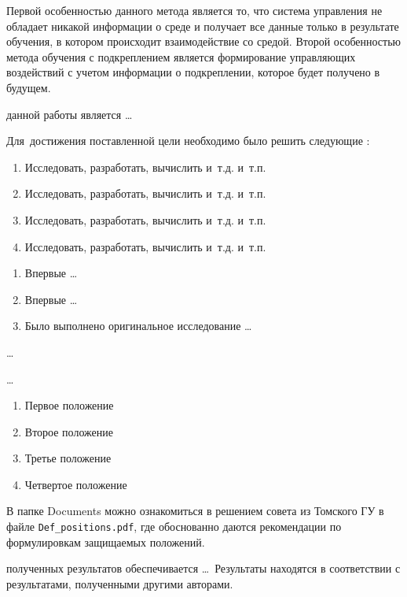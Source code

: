 Первой особенностью данного метода является то, что система управления не обладает никакой информации о среде и получает все данные только в результате обучения, в котором происходит взаимодействие со средой. Второй особенностью метода обучения с подкреплением является формирование управляющих воздействий с учетом информации о подкреплении, которое будет получено в будущем.



{\aim} данной работы является \ldots

Для~достижения поставленной цели необходимо было решить следующие {\tasks}:
\begin{enumerate}
  \item Исследовать, разработать, вычислить и~т.\:д. и~т.\:п.
  \item Исследовать, разработать, вычислить и~т.\:д. и~т.\:п.
  \item Исследовать, разработать, вычислить и~т.\:д. и~т.\:п.
  \item Исследовать, разработать, вычислить и~т.\:д. и~т.\:п.
\end{enumerate}


{\novelty}
\begin{enumerate}
  \item Впервые \ldots
  \item Впервые \ldots
  \item Было выполнено оригинальное исследование \ldots
\end{enumerate}

{\influence} \ldots

{\methods} \ldots

{}
\begin{enumerate}
  \item Первое положение
  \item Второе положение
  \item Третье положение
  \item Четвертое положение
\end{enumerate}
В папке Documents можно ознакомиться в решением совета из Томского ГУ
в файле \verb+Def_positions.pdf+, где обоснованно даются рекомендации
по формулировкам защищаемых положений. 

{\reliability} полученных результатов обеспечивается \ldots \ Результаты находятся в соответствии с результатами, полученными другими авторами.


